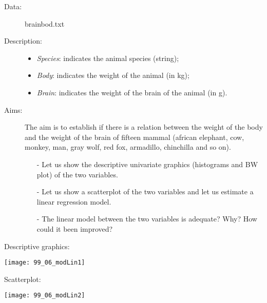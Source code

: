 \begin{frame}
  \begin{description}
    \item[Data: ]brainbod.txt \\ 
    \item[Description: ]
      \begin{footnotesize}
        \begin{itemize}
          \item \textit{Species}: indicates the animal species (string);
          \item \textit{Body}: indicates the weight of the animal (in kg);
          \item \textit{Brain}: indicates the weight of the brain of the animal (in g).
        \end{itemize}
      \end{footnotesize}
    \item[Aims: ]
      \begin{footnotesize}
        The aim is to establish if there is a relation between the weight of the body and the weight of the brain of fifteen mammal (african elephant, cow, monkey, man, gray wolf, red fox, armadillo, chinchilla and so on).
        \begin{itemize}
          \item[-] Let us show the descriptive univariate graphics (histograms and BW plot) of the two variables.
          \item[-] Let us show a scatterplot of the two variables and let us estimate a linear regression model.       
          \item[-] The linear model between the two variables is adequate? Why? How could it been improved?
        \end{itemize}
      \end{footnotesize}
  \end{description}
\end{frame}

\begin{frame}
  Descriptive graphics:\\
  \vspace{-0.3cm}
  \begin{center}
    \texttt{[image: 99\_06\_modLin1]}
  \end{center}
\end{frame}

\begin{frame}
  \vspace{0.5cm}
  Scatterplot:\\
  \vspace{-0.8cm}
  \begin{center}
    \texttt{[image: 99\_06\_modLin2]}
  \end{center}
\end{frame}

